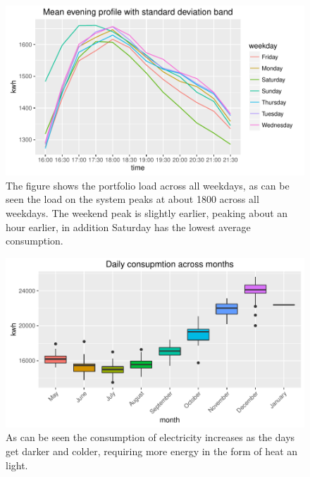 \begin{figure}
    \centering
    \includegraphics[width = \textwidth]{Figures/Results/PortfolioLoad}
    \caption[Portfolio load by day]{The figure shows the portfolio load across all weekdays, as can be seen the load on the system peaks at about 1800 across all weekdays. The weekend peak is slightly earlier, peaking about an hour earlier, in addition Saturday has the lowest average consumption.}
    \label{fig:PortfolioLoad}
\end{figure}

\begin{figure}
    \centering
    \includegraphics[width = \textwidth]{Figures/Results/DailyConsumptionMonths}
    \caption[Daily consumption across months]{As can be seen the consumption of electricity increases as the days get darker and colder, requiring more energy in the form of heat an light.}
    \label{fig:DailyConsumption}
\end{figure}

